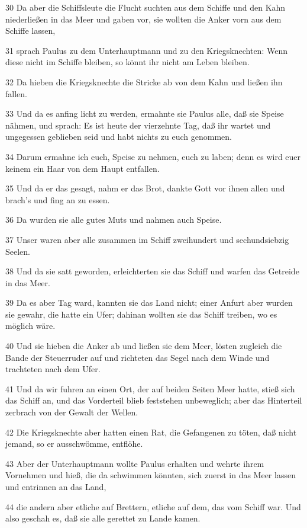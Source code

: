 \par 30 Da aber die Schiffsleute die Flucht suchten aus dem Schiffe und den Kahn niederließen in das Meer und gaben vor, sie wollten die Anker vorn aus dem Schiffe lassen,
\par 31 sprach Paulus zu dem Unterhauptmann und zu den Kriegsknechten: Wenn diese nicht im Schiffe bleiben, so könnt ihr nicht am Leben bleiben.
\par 32 Da hieben die Kriegsknechte die Stricke ab von dem Kahn und ließen ihn fallen.
\par 33 Und da es anfing licht zu werden, ermahnte sie Paulus alle, daß sie Speise nähmen, und sprach: Es ist heute der vierzehnte Tag, daß ihr wartet und ungegessen geblieben seid und habt nichts zu euch genommen.
\par 34 Darum ermahne ich euch, Speise zu nehmen, euch zu laben; denn es wird euer keinem ein Haar von dem Haupt entfallen.
\par 35 Und da er das gesagt, nahm er das Brot, dankte Gott vor ihnen allen und brach's und fing an zu essen.
\par 36 Da wurden sie alle gutes Muts und nahmen auch Speise.
\par 37 Unser waren aber alle zusammen im Schiff zweihundert und sechundsiebzig Seelen.
\par 38 Und da sie satt geworden, erleichterten sie das Schiff und warfen das Getreide in das Meer.
\par 39 Da es aber Tag ward, kannten sie das Land nicht; einer Anfurt aber wurden sie gewahr, die hatte ein Ufer; dahinan wollten sie das Schiff treiben, wo es möglich wäre.
\par 40 Und sie hieben die Anker ab und ließen sie dem Meer, lösten zugleich die Bande der Steuerruder auf und richteten das Segel nach dem Winde und trachteten nach dem Ufer.
\par 41 Und da wir fuhren an einen Ort, der auf beiden Seiten Meer hatte, stieß sich das Schiff an, und das Vorderteil blieb feststehen unbeweglich; aber das Hinterteil zerbrach von der Gewalt der Wellen.
\par 42 Die Kriegsknechte aber hatten einen Rat, die Gefangenen zu töten, daß nicht jemand, so er ausschwömme, entflöhe.
\par 43 Aber der Unterhauptmann wollte Paulus erhalten und wehrte ihrem Vornehmen und hieß, die da schwimmen könnten, sich zuerst in das Meer lassen und entrinnen an das Land,
\par 44 die andern aber etliche auf Brettern, etliche auf dem, das vom Schiff war. Und also geschah es, daß sie alle gerettet zu Lande kamen.

